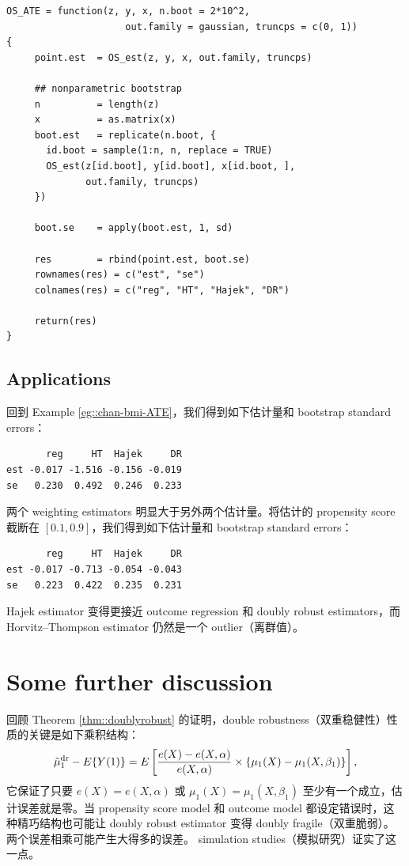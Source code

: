 \begin{lstlisting}
OS_ATE = function(z, y, x, n.boot = 2*10^2,
                     out.family = gaussian, truncps = c(0, 1))
{
     point.est  = OS_est(z, y, x, out.family, truncps)
     
     ## nonparametric bootstrap
     n          = length(z)
     x          = as.matrix(x)
     boot.est   = replicate(n.boot, {
       id.boot = sample(1:n, n, replace = TRUE)
       OS_est(z[id.boot], y[id.boot], x[id.boot, ], 
              out.family, truncps)
     })

     boot.se    = apply(boot.est, 1, sd)
     
     res        = rbind(point.est, boot.se)
     rownames(res) = c("est", "se")
     colnames(res) = c("reg", "HT", "Hajek", "DR")
     
     return(res)
}
\end{lstlisting}




\subsection{Applications}
\label{sec::ATE-application}




回到 Example \ref{eg::chan-bmi-ATE}，我们得到如下估计量和 bootstrap standard errors：
\begin{lstlisting}
       reg     HT  Hajek     DR
est -0.017 -1.516 -0.156 -0.019
se   0.230  0.492  0.246  0.233
\end{lstlisting}
两个 weighting estimators 明显大于另外两个估计量。将估计的 propensity score 截断在 $[0.1, 0.9]$，我们得到如下估计量和 bootstrap standard errors：
\begin{lstlisting}
       reg     HT  Hajek     DR
est -0.017 -0.713 -0.054 -0.043
se   0.223  0.422  0.235  0.231
\end{lstlisting}
Hajek estimator 变得更接近 outcome regression 和 doubly robust estimators，而 Horvitz--Thompson estimator 仍然是一个 outlier（离群值）。



\section{Some further discussion}



回顾 Theorem \ref{thm::doublyrobust} 的证明，double robustness（双重稳健性）性质的关键是如下乘积结构：
$$
\tilde{\mu}_1^\textup{dr} - E\{  Y(1) \} 
= E\left[   \frac{e(X) - e(X,\alpha) }{  e(X,\alpha) }  \times  \left\{  \mu_1(X) -  \mu_1(X, \beta_1)   \right\} \right] ,
$$
它保证了只要 $e(X) = e(X,\alpha) $ 或 $ \mu_1(X) =  \mu_1(X, \beta_1) $ 至少有一个成立，估计误差就是零。当 propensity score model 和 outcome model 都设定错误时，这种精巧结构也可能让 doubly robust estimator 变得 doubly fragile（双重脆弱）。两个误差相乘可能产生大得多的误差。
simulation studies（模拟研究）证实了这一点。


